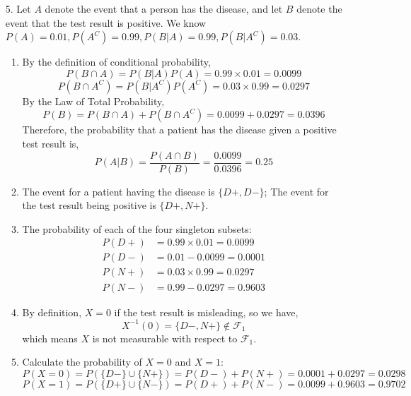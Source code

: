 \documentclass{article}
\begin{document}
\begin{enumerate}
\begin{enumerate}
        \end{enumerate}
        
    
    \item[5.] Let $A$ denote the event that a person has the disease, and let $B$ denote the event that 
    the test result is positive. We know $P(A)=0.01, P(A^C)=0.99, P(B|A)=0.99, P(B|A^C)=0.03$.
        \begin{enumerate}
            \item By the definition of conditional probability,
            $$ P(B \cap A) = P(B|A)P(A) = 0.99 \times 0.01 = 0.0099 $$
            $$ P(B \cap A^C) = P(B|A^C)P(A^C) = 0.03 \times 0.99 = 0.0297 $$
            By the Law of Total Probability,
            $$  P(B) = P(B \cap A) + P(B \cap A^C) = 0.0099 + 0.0297 = 0.0396 $$
            Therefore, the probability that a patient has the disease given a positive test result is,
            $$ P(A|B) = \frac{P(A \cap B)}{P(B)} = \frac{0.0099}{0.0396} = 0.25 $$ 
            
            \item The event for a patient having the disease is $\{  D+, D- \}$;
            The event for the test result being positive is $ \{ D+, N+ \}$.\\
            
            \item The probability of each of the four singleton subsets:
            \begin{align*}
                P(D+) &= 0.99 \times 0.01 = 0.0099 \\
                P(D-) &= 0.01 - 0.0099 = 0.0001    \\
                P(N+) &= 0.03 \times 0.99 = 0.0297 \\
                P(N-) &= 0.99 - 0.0297 = 0.9603
            \end{align*}
            
            \item By definition, $X = 0$ if the test result is misleading, so we have, 
            $$ X^{-1}(0) = \{  D-, N+ \} \not\in \mathcal{F}_1 $$
            which means $X$ is not measurable with respect to $\mathcal{F}_1$. \\
            
            \item Calculate the probability of $X=0$ and $X=1$: 
            $$ P(X=0) = P( \{D-\} \cup \{N+\} ) = P(D-) + P(N+) = 0.0001 + 0.0297 = 0.0298 $$
            $$ P(X=1) = P( \{D+\} \cup \{N-\} ) = P(D+) + P(N-) = 0.0099 + 0.9603 = 0.9702 $$
            

\end{enumerate}
\end{enumerate}
\end{document}
